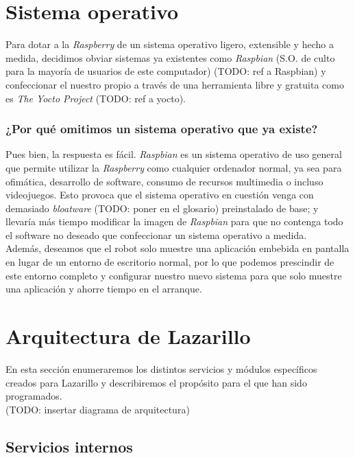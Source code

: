 \section{Sistema operativo}

Para dotar a la \textit{Raspberry} de un sistema operativo ligero, extensible y hecho a medida, decidimos obviar sistemas ya existentes como \textit{Raspbian} (S.O. de culto para la mayoría de usuarios de este computador) (TODO: ref a Raspbian) y confeccionar el nuestro propio a través de una herramienta libre y gratuita como es \textit{The Yocto Project} (TODO: ref a yocto).

\subsubsection{¿Por qué omitimos un sistema operativo que ya existe?}

Pues bien, la respuesta es fácil. \textit{Raspbian} es un sistema operativo de uso general que permite utilizar la \textit{Raspberry} como cualquier ordenador normal, ya sea para ofimática, desarrollo de software, consumo de recursos multimedia o incluso videojuegos. Esto provoca que el sistema operativo en cuestión venga con demasiado \textit{bloatware} (TODO: poner en el glosario) preinstalado de base; y llevaría más tiempo modificar la imagen de \textit{Raspbian} para que no contenga todo el software no deseado que confeccionar un sistema operativo a medida.\\

Además, deseamos que el robot solo muestre una aplicación embebida en pantalla en lugar de un entorno de escritorio normal, por lo que podemos prescindir de este entorno completo y configurar nuestro nuevo sistema para que solo muestre una aplicación y ahorre tiempo en el arranque.\\


\section{Arquitectura de Lazarillo}

En esta sección enumeraremos los distintos servicios y módulos específicos creados para Lazarillo y describiremos el propósito para el que han sido programados.\\

(TODO: insertar diagrama de arquitectura)

\subsection{Servicios internos}

